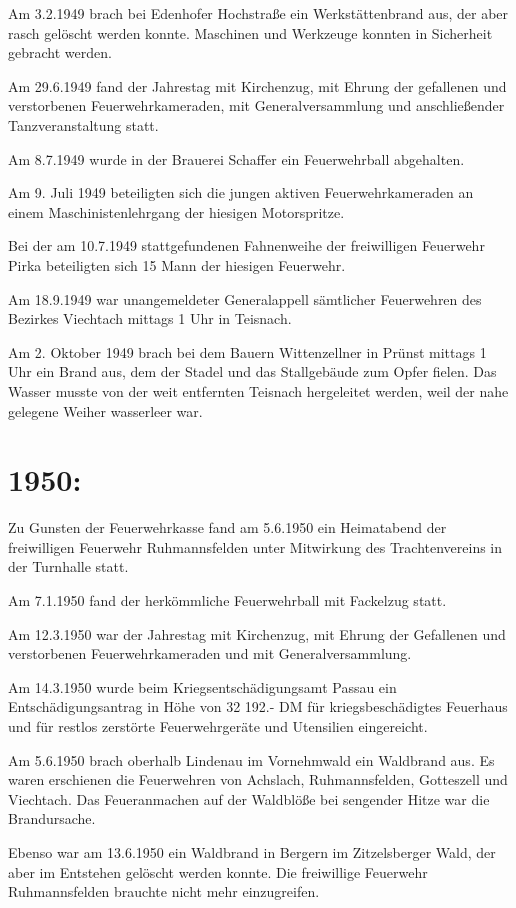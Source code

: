 \documentclass[12pt,a4paper]{book}
\begin{document}
Am 3.2.1949 brach bei Edenhofer Hochstraße ein Werkstättenbrand aus, der aber
rasch gelöscht werden konnte. Maschinen und Werkzeuge konnten in Sicherheit
gebracht werden.

Am 29.6.1949 fand der Jahrestag mit Kirchenzug, mit Ehrung der gefallenen und
verstorbenen Feuerwehrkameraden, mit Generalversammlung und anschließender
Tanzveranstaltung statt.

Am 8.7.1949 wurde in der Brauerei Schaffer ein Feuerwehrball abgehalten.

Am 9. Juli 1949 beteiligten sich die jungen aktiven Feuerwehrkameraden an einem
Maschinistenlehrgang der hiesigen Motorspritze.

Bei der am 10.7.1949 stattgefundenen Fahnenweihe der freiwilligen Feuerwehr
Pirka beteiligten sich 15 Mann der hiesigen Feuerwehr.

Am 18.9.1949 war unangemeldeter Generalappell sämtlicher Feuerwehren des
Bezirkes Viechtach mittags 1 Uhr in Teisnach.

Am 2. Oktober 1949 brach bei dem Bauern Wittenzellner in Prünst mittags 1 Uhr
ein Brand aus, dem der Stadel und das Stallgebäude zum Opfer fielen. Das Wasser
musste von der weit entfernten Teisnach hergeleitet werden, weil der nahe
gelegene Weiher wasserleer war.

\section{1950:}

Zu Gunsten der Feuerwehrkasse fand am 5.6.1950 ein Heimatabend der freiwilligen
Feuerwehr Ruhmannsfelden unter Mitwirkung des Trachtenvereins in der Turnhalle
statt.

Am 7.1.1950 fand der herkömmliche Feuerwehrball mit Fackelzug statt.

Am 12.3.1950 war der Jahrestag mit Kirchenzug, mit Ehrung der Gefallenen und
verstorbenen Feuerwehrkameraden und mit Generalversammlung.

Am 14.3.1950 wurde beim Kriegsentschädigungsamt Passau ein Entschädigungsantrag
in Höhe von 32 192.- DM für kriegsbeschädigtes Feuerhaus und für restlos
zerstörte Feuerwehrgeräte und Utensilien eingereicht.

Am 5.6.1950 brach oberhalb Lindenau im Vornehmwald ein Waldbrand aus. Es waren
erschienen die Feuerwehren von Achslach, Ruhmannsfelden, Gotteszell und
Viechtach. Das Feueranmachen auf der Waldblöße bei sengender Hitze war die
Brandursache.

Ebenso war am 13.6.1950 ein Waldbrand in Bergern im Zitzelsberger Wald, der aber
im Entstehen gelöscht werden konnte. Die freiwillige Feuerwehr Ruhmannsfelden
brauchte nicht mehr einzugreifen.
\end{document}
